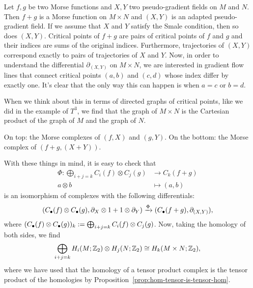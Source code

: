 \begin{myproof}
    Let $f, g$  be two Morse functions and $X, Y$ two pseudo-gradient fields on  $M$ and  $N$.
    Then $f + g$ is a Morse function on $M \times N$ and $(X, Y)$ is an adapted pseudo-gradient field. If we assume that $X$ and  $Y$ satisfy the Smale condition, then so does $(X,Y)$.
    Critical points of $f+g$ are pairs of critical points of $f$ and $g$ and their indices are sums of the original indices.
    Furthermore, trajectories of $(X, Y)$ correspond exactly to pairs of trajectories of $X$ and $Y$.
    Now, in order to understand the differential $\partial_{(X, Y)}$ on $M \times N$, we are interested in gradient flow lines that connect critical points $(a,b)$ and  $(c,d)$ whose index differ by exactly one.
    It's clear that the only way this can happen is when $a = c$ or $b = d$.

    When we think about this in terms of directed graphs of critical points, like we did in the example of $T^{3}$, we find that the graph of $M \times N$ is the Cartesian product of the graph of $M$ and the graph of  $N$.
    \begin{marginfigure}
        \centering
        \caption{On top: the Morse complexes of $(f, X)$ and $(g, Y)$. On the bottom: the Morse complex of $(f+g, (X+Y))$.}
        \label{fig:kunneth-formula}
    \end{marginfigure}
    With these things in mind, it is easy to check that
    \begin{align*}
        \Phi: \bigoplus_{i+j = k} C_i(f) \otimes C_j(g) &\longrightarrow C_k(f+g) \\
        a \otimes b &\longmapsto (a,b)
    \end{align*}
    is an isomorphism of complexes with the following differentials:
    \[
        (C_\bullet(f) \otimes C_\bullet(g), \partial_X \otimes 1 + 1 \otimes \partial_Y) \xrightarrow{\Phi}   (C_\bullet(f+g), \partial_{(X,Y)})
    ,\]
    where $(C_\bullet(f) \otimes C_\bullet(g))_k := \bigoplus_{i+j = k} C_i(f) \otimes C_j(g)$.
    Now, taking the homology of both sides, we find
    \[
        \bigoplus_{i+j = k} H_i(M; \mathbb{Z}_2) \otimes H_j(N; \mathbb{Z}_2) \cong H_k(M \times N; \mathbb{Z}_2)
    ,\]
    where we have used that the homology of a tensor product complex is the tensor product of the homologies by Proposition~\ref{prop:hom-tensor-is-tensor-hom}.
\end{myproof}


